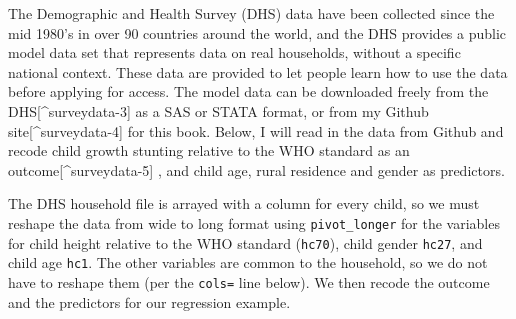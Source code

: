 \documentclass[
]{article}
\begin{document}
The Demographic and Health Survey (DHS) data have been collected since the mid 1980's in over 90 countries around the world, and the DHS provides a public model data set that represents data on real households, without a specific national context. These data are provided to let people learn how to use the data before applying for access. The model data can be downloaded freely from the DHS{[}\^{}surveydata-3{]} as a SAS or STATA format, or from my Github site{[}\^{}surveydata-4{]} for this book. Below, I will read in the data from Github and recode child growth stunting relative to the WHO standard as an outcome{[}\^{}surveydata-5{]} , and child age, rural residence and gender as predictors.

The DHS household file is arrayed with a column for every child, so we must reshape the data from wide to long format using \texttt{pivot\_longer} for the variables for child height relative to the WHO standard (\texttt{hc70}), child gender \texttt{hc27}, and child age \texttt{hc1}. The other variables are common to the household, so we do not have to reshape them (per the \texttt{cols=} line below). We then recode the outcome and the predictors for our regression example.
\end{document}

